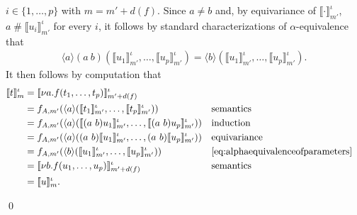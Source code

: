 \documentclass[11pt,a4paper]{amsart}
\newcommand{\fresh}{\mathbin{\#}}
\theoremstyle{plain}
\numberwithin{equation}{section}
\newcommand{\+}[1]{\mathcal{#1}\xspace}
\theoremstyle{definition}
\begin{document}
\begin{itemize}
            \(i \in \{1, \ldots, p\}\) with \(m = m' + d(f)\).  Since
            \(a \neq b\) and, by equivariance of
            \(\llbracket \cdot \rrbracket^\iota_{m'}\),
            \(a \fresh \llbracket u_i \rrbracket^\iota_{m'}\) for every
            \(i\), it follows by standard characterizations of
            $\alpha$-equivalence~\cite{Pitts13} that
            \begin{gather}
                \langle a \rangle (a\ b)(\llbracket u_1 \rrbracket^\iota_{m'}, \ldots, \llbracket u_p \rrbracket^\iota_{m'}) = \langle b \rangle (\llbracket u_1 \rrbracket^\iota_{m'}, \ldots, \llbracket u_p \rrbracket^\iota_{m'}). \label{eq:alphaequivalenceofparameters}
            \end{gather}
            It then follows by computation that
            \begin{align*}
              \llbracket t \rrbracket^\iota_m
              &= \llbracket \nu a.f(t_1, \ldots, t_p) \rrbracket^\iota_{m' + d(f)} \\
              &= f_{A, m'}(\langle a \rangle (\llbracket t_1 \rrbracket^\iota_{m'}, \ldots, \llbracket t_p \rrbracket^\iota_{m'})) && \text{semantics} \\
              &= f_{A, m'}(\langle a \rangle (\llbracket (a\ b)u_1 \rrbracket^\iota_{m'}, \ldots, \llbracket (a\ b)u_p \rrbracket^\iota_{m'})) && \text{induction} \\
              &= f_{A, m'}(\langle a \rangle ((a\ b)\llbracket u_1 \rrbracket^\iota_{m'}, \ldots, (a\ b)\llbracket u_p \rrbracket^\iota_{m'})) && \text{equivariance} \\
              &= f_{A, m'}(\langle b \rangle (\llbracket u_1 \rrbracket^\iota_{m'}, \ldots, \llbracket u_p \rrbracket^\iota_{m'})) && \text{\cref{eq:alphaequivalenceofparameters}} \\
              &= \llbracket \nu b.f(u_1, \ldots, u_p) \rrbracket^\iota_{m' + d(f)} && \text{semantics} \\
              &= \llbracket u \rrbracket^\iota_m.
            \end{align*}
          \end{itemize}
\qed
\end{document}

